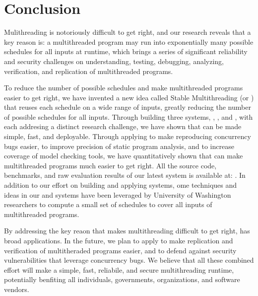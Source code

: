 \chapter{Conclusion} \label{sec:conclusion}

Mulithreading is notoriously difficult to get right, and our research reveals
that a key reason is: a multithreaded program may run into exponentially many
possible schedules for all inputs at runtime, which brings a series of
significant reliability and security challenges on understanding,
testing, debugging, analyzing, verification, and replication of multithreaded
programs.

To reduce the number of possible schedules and make multithreaded
programs easier to get right, we have invented a new idea called Stable
Multithreading (or \smt) that reuses each schedule on a wide range of inputs,
greatly reducing the number of possible schedules for all inputs. Through
building three \smt systems, \tern, \peregrine, and \parrot, with each addresing
a distinct research challenge, we have shown that \smt can be made simple, fast,
and deployable. Through applying \smt to make reproducing concurrency bugs
easier, to improve precision of static program analysis, and to increase
coverage of model checking tools, we have quantitatively shown that \smt can
make multithreaded programs much easier to get right. All the source code,
benchmarks, and raw evaluation results of our latest \smt system \parrot is
available at: \github. In addition to our effort on building and applying \smt
systems, ome techniques and ideas in our \tern and \peregrine systems have been
leveraged by University of Washington researchers to compute a small set of
schedules to cover all inputs of multithreaded programs.

By addressing the key reaon that makes multithreading difficult to get right,
\smt has broad applications. In the future, we plan to apply \smt to make
replication and verification of multitheraded programs easier, and to defend
against security vulnerabilities that leverage concurrency bugs. We believe that
all these combined effort will make \smt a simple, fast, reliabile, and secure
multithreading runtime, potentially benfiting all individuals, governments,
organizations, and software vendors. 